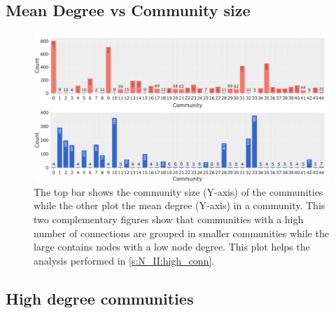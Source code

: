 \subsection{Mean Degree vs Community size}
\begin{figure}   
    \centering
    \includegraphics[width=1.0\textwidth,height=1.0\textheight,keepaspectratio]{Sections/Network_II/resources/reward/Degree_vs_ComSize.png}
    \caption{The top bar shows the community size (Y-axis) of the communities while the other plot the mean degree (Y-axis) in a community. This two complementary figures show that communities with a high number of connections are grouped in smaller communities while the large contains nodes with a low node degree. This plot helps the analysis performed in \cref{s:N_II:high_conn}. } 
    \label{fig:ap:degree_com_size}
\end{figure}



\subsection{High degree communities}

